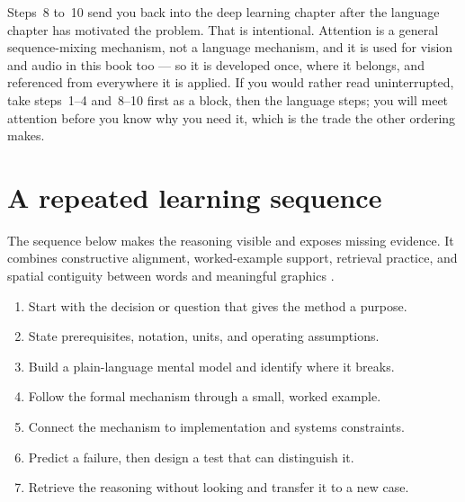 \begin{didacticnote}
Steps~8 to~10 send you back into the deep learning chapter after the language
chapter has motivated the problem. That is intentional. Attention is a general
sequence-mixing mechanism, not a language mechanism, and it is used for vision
and audio in this book too --- so it is developed once, where it belongs, and
referenced from everywhere it is applied. If you would rather read
uninterrupted, take steps~1--4 and~8--10 first as a block, then the language
steps; you will meet attention before you know why you need it, which is the
trade the other ordering makes.
\end{didacticnote}

\section*{A repeated learning sequence}

The sequence below makes the reasoning visible and exposes missing evidence.
It combines constructive alignment, worked-example support, retrieval
practice, and spatial contiguity between words and meaningful graphics
\cite{biggsEnhancingTeachingConstructive1996,
swellerCognitiveLoadTheory2019,dunloskyImprovingStudentsLearning2013,
roedigerTestEnhancedLearning2006,mayerUsingMultimediaElearning2017}.

\begin{enumerate}
  \item Start with the decision or question that gives the method a purpose.
  \item State prerequisites, notation, units, and operating assumptions.
  \item Build a plain-language mental model and identify where it breaks.
  \item Follow the formal mechanism through a small, worked example.
  \item Connect the mechanism to implementation and systems constraints.
  \item Predict a failure, then design a test that can distinguish it.
  \item Retrieve the reasoning without looking and transfer it to a new case.
\end{enumerate}

